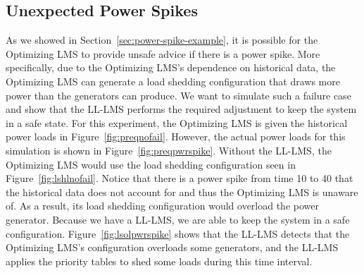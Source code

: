 \documentclass{acm_proc_article-sp}
\begin{document}
\subsection{Unexpected Power Spikes}
\label{sec:power-spikes-simulation}
As we showed in Section~\ref{sec:power-spike-example}, it is possible for the Optimizing LMS to provide unsafe advice if there is a power spike. 
More specifically, due to the Optimizing LMS's dependence on historical data, the Optimizing LMS can generate a load shedding configuration that draws more power than the generators can produce. 
We want to simulate such a failure case and show that the LL-LMS performs the required adjustment to keep the system in a safe state. 
For this experiment, the Optimizing LMS is given the historical power loads in Figure~\ref{fig:preqnofail}. 
However, the actual power loads for this simulation is shown in Figure~\ref{fig:preqpwrspike}. 
Without the LL-LMS, the Optimizing LMS would use the load shedding configuration seen in Figure~\ref{fig:lshlnofail}. 
Notice that there is a power spike from time 10 to 40 that the historical data does not account for and thus the Optimizing LMS is unaware of. 
As a result, its load shedding configuration would overload the power generator. 
Because we have a LL-LMS, we are able to keep the system in a safe configuration.
Figure~\ref{fig:lsolpwrspike} shows that the LL-LMS detects that the Optimizing LMS's configuration overloads some generators, and the LL-LMS applies the priority tables to shed some loads during this time interval.
\end{document}
